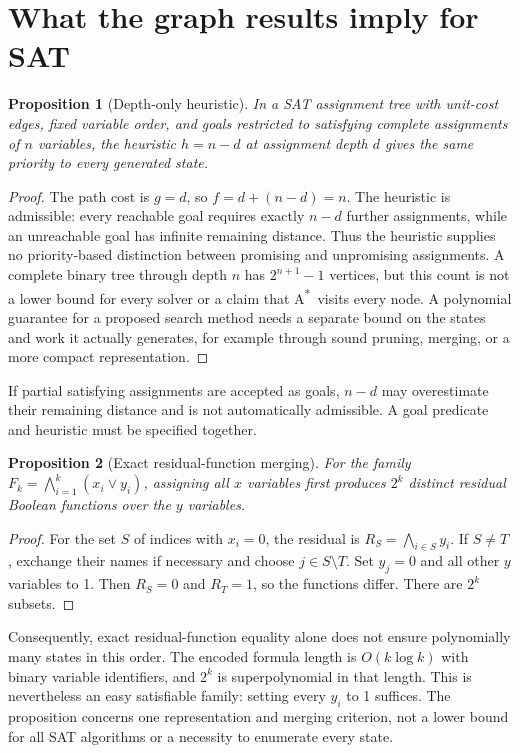 \documentclass[11pt,a4paper]{article}
\newtheorem{proposition}{Proposition}
\newcommand{\astar}{A\textsuperscript{*}}
\begin{document}
\section{What the graph results imply for SAT}
\begin{proposition}[Depth-only heuristic]
In a SAT assignment tree with unit-cost edges, fixed variable order, and goals restricted to satisfying complete assignments of $n$ variables, the heuristic $h=n-d$ at assignment depth $d$ gives the same priority to every generated state.
\end{proposition}
\begin{proof}
The path cost is $g=d$, so $f=d+(n-d)=n$. The heuristic is admissible: every reachable goal requires exactly $n-d$ further assignments, while an unreachable goal has infinite remaining distance. Thus the heuristic supplies no priority-based distinction between promising and unpromising assignments. A complete binary tree through depth $n$ has $2^{n+1}-1$ vertices, but this count is not a lower bound for every solver or a claim that \astar\ visits every node. A polynomial guarantee for a proposed search method needs a separate bound on the states and work it actually generates, for example through sound pruning, merging, or a more compact representation.
\end{proof}
If partial satisfying assignments are accepted as goals, $n-d$ may overestimate their remaining distance and is not automatically admissible. A goal predicate and heuristic must be specified together.

\begin{proposition}[Exact residual-function merging]
For the family $F_k=\bigwedge_{i=1}^k(x_i\lor y_i)$, assigning all $x$ variables first produces $2^k$ distinct residual Boolean functions over the $y$ variables.
\end{proposition}
\begin{proof}
For the set $S$ of indices with $x_i=0$, the residual is $R_S=\bigwedge_{i\in S}y_i$. If $S\ne T$, exchange their names if necessary and choose $j\in S\setminus T$. Set $y_j=0$ and all other $y$ variables to 1. Then $R_S=0$ and $R_T=1$, so the functions differ. There are $2^k$ subsets.
\end{proof}
Consequently, exact residual-function equality alone does not ensure polynomially many states in this order. The encoded formula length is $O(k\log k)$ with binary variable identifiers, and $2^k$ is superpolynomial in that length. This is nevertheless an easy satisfiable family: setting every $y_i$ to 1 suffices. The proposition concerns one representation and merging criterion, not a lower bound for all SAT algorithms or a necessity to enumerate every state.
\end{document}
